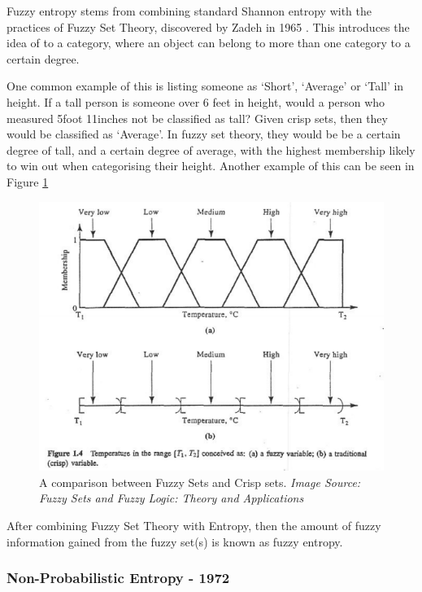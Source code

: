 Fuzzy entropy stems from combining standard Shannon entropy with the practices of Fuzzy Set Theory, discovered by Zadeh in 1965 \cite{Zadeh_1965}. This introduces the idea of  to a category, where an object can belong to more than one category to a certain degree.

One common example of this is listing someone as `Short', `Average' or `Tall' in height. If a tall person is someone over 6 feet in height, would a person who measured 5foot 11inches not be classified as tall? Given crisp sets, then they would be classified as `Average'. In fuzzy set theory, they would be be a certain degree of tall, and a certain degree of average, with the highest membership likely to win out when categorising their height. Another example of this can be seen in Figure \ref{fig:fuzzy-sets}

\begin{figure}[H]
  \center
  \includegraphics[scale=0.5]{Chapter1/lit-review-img/fuzzy-sets.png}
  \caption{A comparison between Fuzzy Sets and Crisp sets. \textit{Image Source: Fuzzy Sets and Fuzzy Logic: Theory and Applications \cite{GEORGE_J_BO_2008}}}
  \label{fig:fuzzy-sets}
\end{figure}

After combining Fuzzy Set Theory with Entropy, then the amount of fuzzy information gained from the fuzzy set(s) is known as fuzzy entropy.

\subsubsection{Non-Probabilistic Entropy - 1972}
\label{sssec:non-prob-review}

